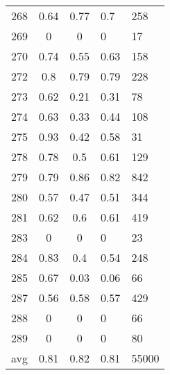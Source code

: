 \begin{longtable}[c]{|l|c|c|l|l|}
	268      & 0.64      & 0.77   & 0.7      & 258     \\
	269      & 0         & 0      & 0        & 17      \\
	270      & 0.74      & 0.55   & 0.63     & 158     \\
	272      & 0.8       & 0.79   & 0.79     & 228     \\
	273      & 0.62      & 0.21   & 0.31     & 78      \\
	274      & 0.63      & 0.33   & 0.44     & 108     \\
	275      & 0.93      & 0.42   & 0.58     & 31      \\
	278      & 0.78      & 0.5    & 0.61     & 129     \\
	279      & 0.79      & 0.86   & 0.82     & 842     \\
	280      & 0.57      & 0.47   & 0.51     & 344     \\
	281      & 0.62      & 0.6    & 0.61     & 419     \\
	283      & 0         & 0      & 0        & 23      \\
	284      & 0.83      & 0.4    & 0.54     & 248     \\
	285      & 0.67      & 0.03   & 0.06     & 66      \\
	287      & 0.56      & 0.58   & 0.57     & 429     \\
	288      & 0         & 0      & 0        & 66      \\
	289      & 0         & 0      & 0        & 80      \\
	avg      & 0.81      & 0.82   & 0.81     & 55000  
\end{longtable}
